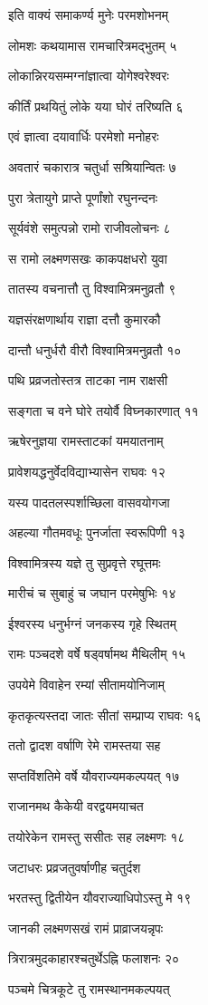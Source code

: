 इति वाक्यं समाकर्ण्य मुनेः परमशोभनम्

लोमशः कथयामास रामचारित्रमद्भुतम् ५

लोकान्निरयसम्मग्नांज्ञात्वा योगेश्वरेश्वरः

कीर्तिं प्रथयितुं लोके यया घोरं तरिष्यति ६

एवं ज्ञात्वा दयावार्धिः परमेशो मनोहरः

अवतारं चकारात्र चतुर्धा सश्रियान्वितः ७

पुरा त्रेतायुगे प्राप्ते पूर्णांशो रघुनन्दनः

सूर्यवंशे समुत्पन्नो रामो राजीवलोचनः ८

स रामो लक्ष्मणसखः काकपक्षधरो युवा

तातस्य वचनात्तौ तु विश्वामित्रमनुव्रतौ ९

यज्ञसंरक्षणार्थाय राज्ञा दत्तौ कुमारकौ

दान्तौ धनुर्धरौ वीरौ विश्वामित्रमनुव्रतौ १०

पथि प्रव्रजतोस्तत्र ताटका नाम राक्षसी

सङ्गता च वने घोरे तयोर्वै विघ्नकारणात् ११

ऋषेरनुज्ञया रामस्ताटकां यमयातनाम्

प्रावेशयद्धनुर्वेदविद्याभ्यासेन राघवः १२

यस्य पादतलस्पर्शाच्छिला वासवयोगजा

अहल्या गौतमवधूः पुनर्जाता स्वरूपिणी १३

विश्वामित्रस्य यज्ञे तु सुप्रवृत्ते रघूत्तमः

मारीचं च सुबाहुं च जघान परमेषुभिः १४

ईश्वरस्य धनुर्भग्नं जनकस्य गृहे स्थितम्

रामः पञ्चदशे वर्षे षड्वर्षामथ मैथिलीम् १५

उपयेमे विवाहेन रम्यां सीतामयोनिजाम्

कृतकृत्यस्तदा जातः सीतां सम्प्राप्य राघवः १६

ततो द्वादश वर्षाणि रेमे रामस्तया सह

सप्तविंशतिमे वर्षे यौवराज्यमकल्पयत् १७

राजानमथ कैकेयी वरद्वयमयाचत

तयोरेकेन रामस्तु ससीतः सह लक्ष्मणः १८

जटाधरः प्रव्रजतुवर्षाणीह चतुर्दश

भरतस्तु द्वितीयेन यौवराज्याधिपोऽस्तु मे १९

जानकी लक्ष्मणसखं रामं प्राव्राजयन्नृपः

त्रिरात्रमुदकाहारश्चतुर्थेऽह्नि फलाशनः २०

पञ्चमे चित्रकूटे तु रामस्थानमकल्पयत्

